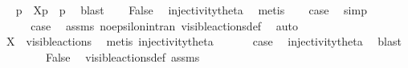 \begin{isabellebody}
\ \isamarkupfalse%
\ p{\isacharprime}{\kern0pt}\ \ {\isacartoucheopen}{\isasymtheta}{\isacharbrackleft}{\kern0pt}X{\isacharbrackright}{\kern0pt}{\isacharparenleft}{\kern0pt}p{\isacharparenright}{\kern0pt}\ {\isacharequal}{\kern0pt}\ {\isasymtheta}{\isacharparenleft}{\kern0pt}p{\isacharprime}{\kern0pt}{\isacharparenright}{\kern0pt}{\isacartoucheclose}\ \isamarkupfalse%
\ blast\isanewline
\ \ \isamarkupfalse%
\ False\ \isamarkupfalse%
\ injectivity{\isacharunderscore}{\kern0pt}theta{\isacharparenleft}{\kern0pt}{}{\isacharparenright}{\kern0pt}\ \isamarkupfalse%
\ metis\isanewline
\ \ \isamarkupfalse%
\ {\isacharquery}{\kern0pt}case\ \isamarkupfalse%
\ simp\isanewline
{}\isamarkupfalse%
\isanewline
\ \ \isamarkupfalse%
\ {}\isanewline
\ \ \isamarkupfalse%
\ \isamarkupfalse%
\ {\isacharquery}{\kern0pt}case\ \isamarkupfalse%
\ assms{\isacharparenleft}{\kern0pt}{}{\isacharparenright}{\kern0pt}\ no{\isacharunderscore}{\kern0pt}epsilon{\isacharunderscore}{\kern0pt}in{\isacharunderscore}{\kern0pt}tran{\isacharparenleft}{\kern0pt}{}{\isacharparenright}{\kern0pt}\ visible{\isacharunderscore}{\kern0pt}actions{\isacharunderscore}{\kern0pt}def\ \isamarkupfalse%
\ auto\isanewline
{}\isamarkupfalse%
\isanewline
\ \ \isamarkupfalse%
\ {}\isanewline
\ \ \isamarkupfalse%
\ {\isacartoucheopen}X\ {\isasymsubseteq}\ visible{\isacharunderscore}{\kern0pt}actions{\isacartoucheclose}\ \isamarkupfalse%
\ {\isacharparenleft}{\kern0pt}metis\ injectivity{\isacharunderscore}{\kern0pt}theta{\isacharparenleft}{\kern0pt}{}{\isacharparenright}{\kern0pt}{\isacharparenright}{\kern0pt}\isanewline
\ \ \isamarkupfalse%
\ {}\ \isamarkupfalse%
\ {\isacharquery}{\kern0pt}case\ \isamarkupfalse%
\ injectivity{\isacharunderscore}{\kern0pt}theta{\isacharparenleft}{\kern0pt}{}{\isacharparenright}{\kern0pt}\ \isamarkupfalse%
\ blast\isanewline
{}\isamarkupfalse%
\isanewline
\ \ \isamarkupfalse%
\ {}\isanewline
\ \ \isamarkupfalse%
\ False\ \isamarkupfalse%
\ visible{\isacharunderscore}{\kern0pt}actions{\isacharunderscore}{\kern0pt}def\ assms{\isacharparenleft}{\kern0pt}{}{\isacharparenright}{\kern0pt}\ \isamarkupfalse%

\end{isabellebody}
